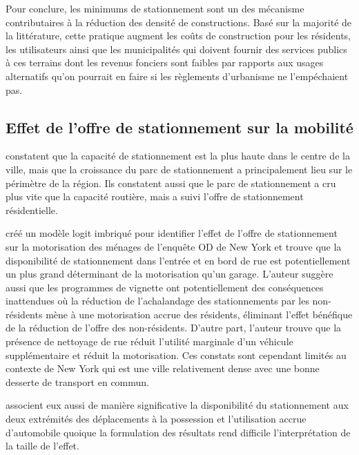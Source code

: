     Pour conclure, les minimums de stationnement sont un des mécanisme contributaires à la réduction des densité de constructions. Basé sur la majorité de la littérature, cette pratique augment les coûts de construction pour les résidents, les utilisateurs ainsi que les municipalités qui doivent fournir des services publics à ces terrains dont les revenus fonciers sont faibles par rapports aux usages alternatifs qu'on pourrait en faire si les règlements d'urbanisme ne l'empéchaient pas.

  \subsection{Effet de l'offre de stationnement sur la mobilité}
    \textcite{chester_parking_2015} constatent que la capacité de stationnement est la plus haute dans le centre de la ville, mais que la croissance du parc de stationnement a principalement lieu sur le périmètre de la région.  Ils constatent aussi que le parc de stationnement a cru plus vite que la capacité routière, mais a suivi l'offre de stationnement résidentielle.\par
    \textcite{guo_does_2013} créé un modèle logit imbriqué pour identifier l'effet de l'offre de stationnement sur la motorisation des ménages de l'enquête OD de New York et trouve que la disponibilité de stationnement dans l'entrée et en bord de rue est potentiellement un plus grand déterminant de la motorisation qu'un garage. L'auteur suggère aussi que les programmes de vignette ont potentiellement des conséquences inattendues où la réduction de l'achalandage des stationnements par les non-résidents mène à une motorisation accrue des résidents, éliminant l'effet bénéfique de la réduction de l'offre des non-résidents. D'autre part, l'auteur trouve que la présence de nettoyage de rue réduit l'utilité marginale d'un véhicule supplémentaire et réduit la motorisation. Ces constats sont cependant limités au contexte de New York qui est une ville relativement dense avec une bonne desserte de transport en commun.\par
    \textcite{yin_built_2018} associent eux aussi de manière significative la disponibilité du stationnement aux deux extrémités des déplacements à la possession et l'utilisation accrue d'automobile quoique la formulation des résultats rend difficile l'interprétation de la taille de l'effet.\par
